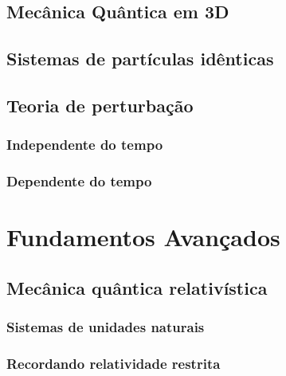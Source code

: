 \documentclass{header}
\begin{document}
    \chapter{\hspace{0.8cm}Mecânica Quântica em 3D}
    
    \chapter{\hspace{0.8cm}Sistemas de partículas idênticas}
    
    \chapter{\hspace{0.8cm}Teoria de perturbação}

        \section{Independente do tempo}

        \section{Dependente do tempo}

\part{Fundamentos Avançados}

    \chapter{\hspace{0.8cm}Mecânica quântica relativística}
        

        \section{Sistemas de unidades naturais}
            

        \section{Recordando relatividade restrita}
            
\end{document}
